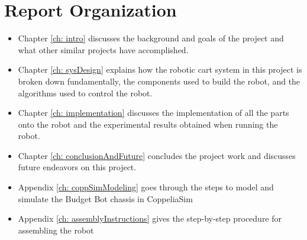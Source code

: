 \section{Report Organization}
\begin{itemize}
    \item Chapter \ref{ch: intro} discusses the background and goals of the project and what other similar projects have accomplished.
    \item Chapter \ref{ch: sysDesign} explains how the robotic cart system in this project is broken down fundamentally, the components used to build the robot, and the algorithms used to control the robot.
    \item Chapter \ref{ch: implementation} discusses the implementation of all the parts onto the robot and the experimental results obtained when running the robot.
    \item Chapter \ref{ch: conclusionAndFuture} concludes the project work and discusses future endeavors on this project.
    \item Appendix \ref{ch: coppSimModeling} goes through the steps to model and simulate the Budget Bot chassis in CoppeliaSim
    \item Appendix \ref{ch: assemblyInstructions} gives the step-by-step procedure for assembling the robot
\end{itemize}


